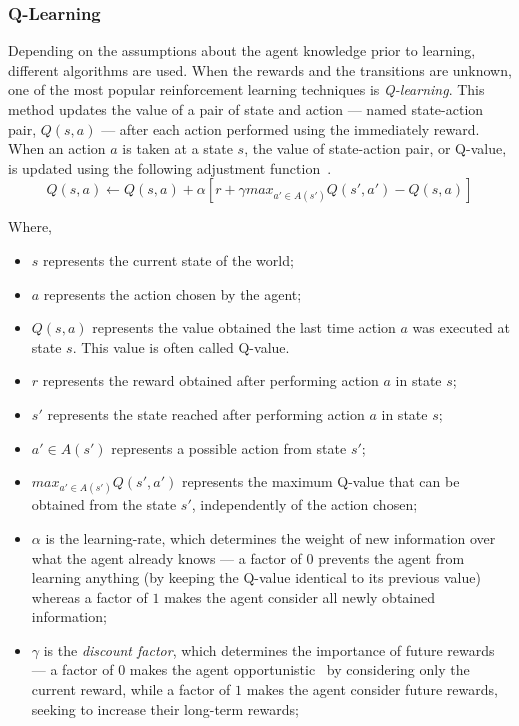 \subsubsection{Q-Learning}
\label{subsubsec:ql}

Depending on the assumptions about the agent knowledge prior to learning, different algorithms are used. 
When the rewards and the transitions are unknown, one of the most popular reinforcement learning techniques is \textit{Q-learning}. 
This method updates the value of a pair of state and action --- named state-action pair, $Q(s,a)$ ---
after each action performed using the immediately reward. 
When an action $a$ is taken at a state $s$, the value of state-action pair, or Q-value,
is updated using the following adjustment function~\cite{amato2010highlevel}.
% 
	$$Q(s,a) \leftarrow Q(s,a) + \alpha[r + \gamma max_{a' \in A(s')}Q(s',a') - Q(s,a)]$$
% 

Where, 
\begin{itemize}
\item $s$ represents the current state of the world;
\item $a$ represents the action chosen by the agent;
\item $ Q(s,a) $ represents the value obtained the last time action $a$ was executed at state $s$.
This value is often called Q-value.
\item $r$ represents the reward obtained after performing action $a$ in state $s$;
\item $s'$ represents the state reached after performing action $a$ in state $s$;
\item $a' \in A(s')$ represents a possible action from state $s'$;
\item $max_{a' \in A(s')}Q(s',a')$ represents the maximum Q-value that can be obtained from the state $s'$, independently of the action chosen;
\item $\alpha$ is the learning-rate, which determines the weight of new information over what the agent already knows --- a factor of $0$ prevents the agent from learning anything (by keeping the Q-value identical to its previous value) whereas a factor of $1$ makes the agent consider all newly obtained information;
\item $\gamma$ is the \textit{discount factor}, which determines the importance of future rewards --- a factor of $0$ makes the agent opportunistic~\cite{schweighofer2003meta} by considering only the current reward, while a factor of $1$ makes the agent consider future rewards, seeking to increase their long-term rewards;
\end{itemize}

